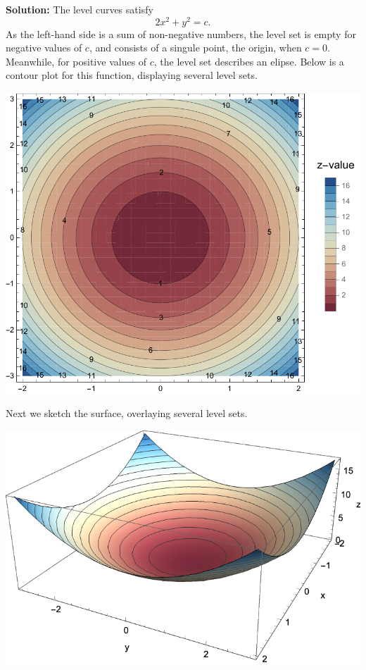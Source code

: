 \documentclass[12pt,oneside]{exam}
\newenvironment{newsolution}{\vspace{.1in}\noindent\textbf{Solution: \hspace{.05em}}}{}
\begin{document}
\begin{newsolution}
The level curves satisfy 
\begin{equation*}
2x^2 + y^2 = c.
\end{equation*}
As the left-hand side is a sum of non-negative numbers, the level set is empty for negative values of $c$, and consists of a singule point, the origin, when $c=0$. Meanwhile, for positive values of $c$, the level set describes an elipse. Below is a contour plot for this function, displaying several level sets.
\begin{center}
\includegraphics[scale=0.5]{p4.pdf}
\end{center}
Next we sketch the surface, overlaying several level sets.
\begin{center}
\includegraphics[scale=0.5]{p5.pdf}
\end{center}
\end{newsolution}
\end{document}
